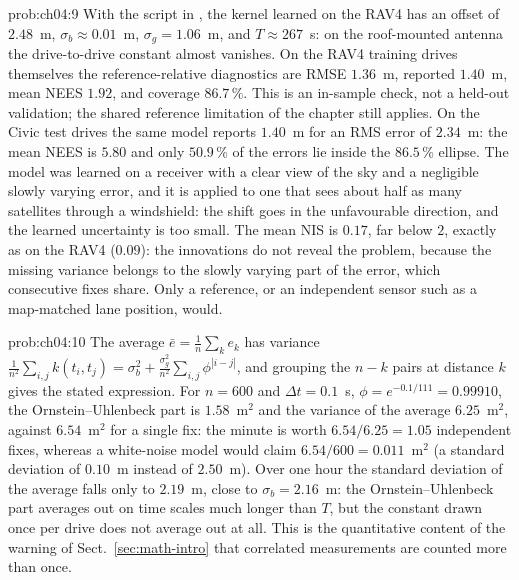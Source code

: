 \begin{sol}{prob:ch04:9}
With the script  in , the kernel learned on the RAV4 has an offset of $2.48$~m, $\sigma_b\approx0.01$~m, $\sigma_g=1.06$~m, and $T\approx267$~s: on the roof-mounted antenna the drive-to-drive constant almost vanishes. On the RAV4 training drives themselves the reference-relative diagnostics are RMSE $1.36$~m, reported $1.40$~m, mean NEES $1.92$, and coverage $86.7\,\%$. This is an in-sample check, not a held-out validation; the shared reference limitation of the chapter still applies. On the Civic test drives the same model reports $1.40$~m for an RMS error of $2.34$~m: the mean NEES is $5.80$ and only $50.9\,\%$ of the errors lie inside the $86.5\,\%$ ellipse. The model was learned on a receiver with a clear view of the sky and a negligible slowly varying error, and it is applied to one that sees about half as many satellites through a windshield: the shift goes in the unfavourable direction, and the learned uncertainty is too small. The mean NIS is $0.17$, far below $2$, exactly as on the RAV4 ($0.09$): the innovations do not reveal the problem, because the missing variance belongs to the slowly varying part of the error, which consecutive fixes share. Only a reference, or an independent sensor such as a map-matched lane position, would.
\end{sol}
\begin{sol}{prob:ch04:10}
The average $\bar e=\frac1n\sum_k e_k$ has variance $\frac{1}{n^{2}}\sum_{i,j}k(t_i,t_j)=\sigma_b^{2}+\frac{\sigma_g^{2}}{n^{2}}\sum_{i,j}\phi^{|i-j|}$, and grouping the $n-k$ pairs at distance $k$ gives the stated expression. For $n=600$ and $\Delta t=0.1$~s, $\phi=e^{-0.1/111}=0.99910$, the Ornstein--Uhlenbeck part is $1.58$~m$^{2}$ and the variance of the average $6.25$~m$^{2}$, against $6.54$~m$^{2}$ for a single fix: the minute is worth $6.54/6.25=1.05$ independent fixes, whereas a white-noise model would claim $6.54/600=0.011$~m$^{2}$ (a standard deviation of $0.10$~m instead of $2.50$~m). Over one hour the standard deviation of the average falls only to $2.19$~m, close to $\sigma_b=2.16$~m: the Ornstein--Uhlenbeck part averages out on time scales much longer than $T$, but the constant drawn once per drive does not average out at all. This is the quantitative content of the warning of Sect.~\ref{sec:math-intro} that correlated measurements are counted more than once.
\end{sol}
